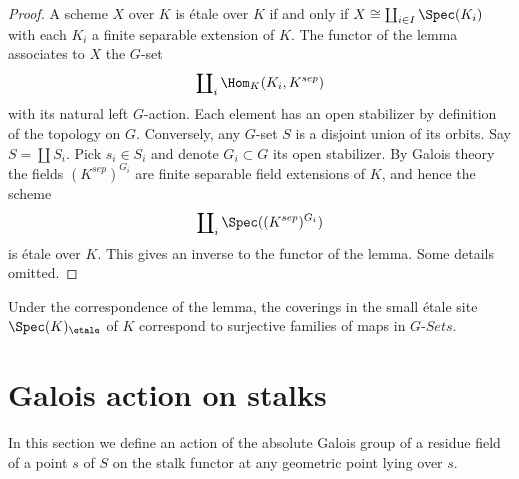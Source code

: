 \begin{proof}
A scheme $X$ over $K$ is \'etale over $K$ if and only if
$X \cong \coprod_{i\in I} \Spec(K_i)$ with
each $K_i$ a finite separable extension of $K$.
The functor of the lemma associates to $X$ the $G$-set
$$
\coprod\nolimits_i \Hom_K(K_i, K^{sep})
$$
with its natural left $G$-action. Each element has an open stabilizer
by definition of the topology on $G$. Conversely, any $G$-set $S$
is a disjoint union of its orbits. Say $S = \coprod S_i$. Pick $s_i \in S_i$
and denote $G_i \subset G$ its open stabilizer. By Galois theory the fields
$(K^{sep})^{G_i}$ are finite separable field extensions of $K$, and
hence the scheme
$$
\coprod\nolimits_i \Spec((K^{sep})^{G_i})
$$
is \'etale over $K$. This gives an inverse to the functor of the lemma.
Some details omitted.
\end{proof}

\begin{remark}
\label{remark-covering-surjective}
Under the correspondence of the lemma, the coverings in the small \'etale site
$\Spec(K)_\etale$ of $K$ correspond to surjective families of
maps in $G\textit{-Sets}$.
\end{remark}







\section{Galois action on stalks}
\label{section-galois-action-stalks}

\noindent
In this section we define an action of the absolute Galois group of a residue
field of a point $s$ of $S$ on the stalk functor at any geometric point lying
over $s$.

